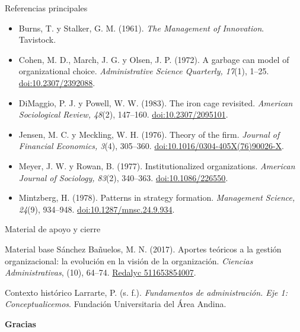 \documentclass[spanish,aspectratio=169,xcolor={dvipsnames,table}]{beamer}
\begin{document}
\begin{frame}{Referencias principales}
  \footnotesize
  \begin{itemize}
    \item Burns, T. y Stalker, G. M. (1961). \textit{The Management of Innovation}. Tavistock.
    \item Cohen, M. D., March, J. G. y Olsen, J. P. (1972). A garbage can model of organizational choice. \textit{Administrative Science Quarterly, 17}(1), 1--25. \href{https://doi.org/10.2307/2392088}{doi:10.2307/2392088}.
    \item DiMaggio, P. J. y Powell, W. W. (1983). The iron cage revisited. \textit{American Sociological Review, 48}(2), 147--160. \href{https://doi.org/10.2307/2095101}{doi:10.2307/2095101}.
    \item Jensen, M. C. y Meckling, W. H. (1976). Theory of the firm. \textit{Journal of Financial Economics, 3}(4), 305--360. \href{https://doi.org/10.1016/0304-405X(76)90026-X}{doi:10.1016/0304-405X(76)90026-X}.
    \item Meyer, J. W. y Rowan, B. (1977). Institutionalized organizations. \textit{American Journal of Sociology, 83}(2), 340--363. \href{https://doi.org/10.1086/226550}{doi:10.1086/226550}.
    \item Mintzberg, H. (1978). Patterns in strategy formation. \textit{Management Science, 24}(9), 934--948. \href{https://doi.org/10.1287/mnsc.24.9.934}{doi:10.1287/mnsc.24.9.934}.
  \end{itemize}
\end{frame}

\begin{frame}{Material de apoyo y cierre}
  \small
  \begin{block}{Material base}
    Sánchez Bañuelos, M. N. (2017). Aportes teóricos a la gestión organizacional: la evolución en la visión de la organización. \textit{Ciencias Administrativas}, (10), 64--74. \href{https://www.redalyc.org/articulo.oa?id=511653854007}{Redalyc 511653854007}.
  \end{block}
  \begin{block}{Contexto histórico}
    Larrarte, P. (s. f.). \textit{Fundamentos de administración. Eje 1: Conceptualicemos}. Fundación Universitaria del Área Andina.
  \end{block}
  \vfill
  \begin{center}
    {\Large\bfseries\color{itescaRedDark}Gracias}\par
    \vspace{.15cm}{\small La organización aprende cuando convierte incertidumbre en conversación, decisión y acción.}
  \end{center}
\end{frame}
\end{document}
